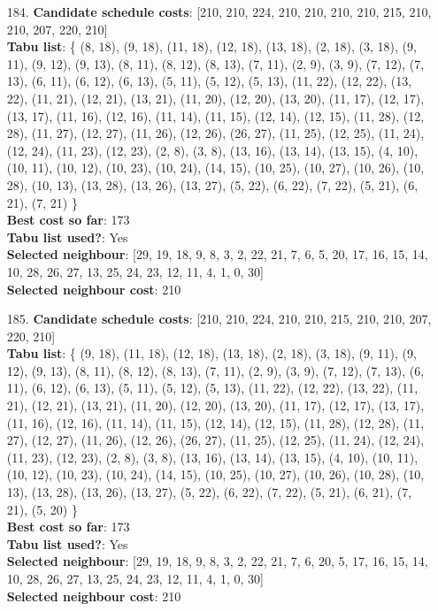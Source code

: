 \documentclass[fleqn]{article}
\begin{document}
\begin{itemize}
    \item[184.] \textbf{Candidate schedule costs}: [210, 210, 224, 210, 210, 210, 210, 215, 210, 210, 207, 220, 210] \\
    \textbf{Tabu list}: \{ (8, 18), (9, 18), (11, 18), (12, 18), (13, 18), (2, 18), (3, 18), (9, 11), (9, 12), (9, 13), (8, 11), (8, 12), (8, 13), (7, 11), (2, 9), (3, 9), (7, 12), (7, 13), (6, 11), (6, 12), (6, 13), (5, 11), (5, 12), (5, 13), (11, 22), (12, 22), (13, 22), (11, 21), (12, 21), (13, 21), (11, 20), (12, 20), (13, 20), (11, 17), (12, 17), (13, 17), (11, 16), (12, 16), (11, 14), (11, 15), (12, 14), (12, 15), (11, 28), (12, 28), (11, 27), (12, 27), (11, 26), (12, 26), (26, 27), (11, 25), (12, 25), (11, 24), (12, 24), (11, 23), (12, 23), (2, 8), (3, 8), (13, 16), (13, 14), (13, 15), (4, 10), (10, 11), (10, 12), (10, 23), (10, 24), (14, 15), (10, 25), (10, 27), (10, 26), (10, 28), (10, 13), (13, 28), (13, 26), (13, 27), (5, 22), (6, 22), (7, 22), (5, 21), (6, 21), (7, 21) \} \\
    \textbf{Best cost so far}: 173 \\
    \textbf{Tabu list used?}: Yes \\
    \textbf{Selected neighbour}: [29, 19, 18, 9, 8, 3, 2, 22, 21, 7, 6, 5, 20, 17, 16, 15, 14, 10, 28, 26, 27, 13, 25, 24, 23, 12, 11, 4, 1, 0, 30] \\
    \textbf{Selected neighbour cost}: 210
      

    \item[185.] \textbf{Candidate schedule costs}: [210, 210, 224, 210, 210, 215, 210, 210, 207, 220, 210] \\
    \textbf{Tabu list}: \{ (9, 18), (11, 18), (12, 18), (13, 18), (2, 18), (3, 18), (9, 11), (9, 12), (9, 13), (8, 11), (8, 12), (8, 13), (7, 11), (2, 9), (3, 9), (7, 12), (7, 13), (6, 11), (6, 12), (6, 13), (5, 11), (5, 12), (5, 13), (11, 22), (12, 22), (13, 22), (11, 21), (12, 21), (13, 21), (11, 20), (12, 20), (13, 20), (11, 17), (12, 17), (13, 17), (11, 16), (12, 16), (11, 14), (11, 15), (12, 14), (12, 15), (11, 28), (12, 28), (11, 27), (12, 27), (11, 26), (12, 26), (26, 27), (11, 25), (12, 25), (11, 24), (12, 24), (11, 23), (12, 23), (2, 8), (3, 8), (13, 16), (13, 14), (13, 15), (4, 10), (10, 11), (10, 12), (10, 23), (10, 24), (14, 15), (10, 25), (10, 27), (10, 26), (10, 28), (10, 13), (13, 28), (13, 26), (13, 27), (5, 22), (6, 22), (7, 22), (5, 21), (6, 21), (7, 21), (5, 20) \} \\
    \textbf{Best cost so far}: 173 \\
    \textbf{Tabu list used?}: Yes \\
    \textbf{Selected neighbour}: [29, 19, 18, 9, 8, 3, 2, 22, 21, 7, 6, 20, 5, 17, 16, 15, 14, 10, 28, 26, 27, 13, 25, 24, 23, 12, 11, 4, 1, 0, 30] \\
    \textbf{Selected neighbour cost}: 210
      


\end{itemize}
\end{document}
